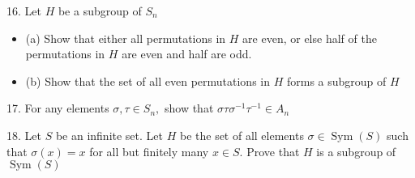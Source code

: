 \begin{mdframed}[style=darkAnswer,frametitle={Joe Starr}]
\end{mdframed}
\newpage
\begin{mdframed}[style=darkQuesion]
  16. Let $H$ be a subgroup of $S_{n}$
  \begin{itemize}
    \item []{(a) Show that either all permutations in $H$ are even, or else half of the permutations
    in $H$ are even and half are odd.}
    \item []{(b) Show that the set of all even permutations in $H$ forms a subgroup of $H$}
  \end{itemize}
\end{mdframed}
\begin{mdframed}[style=darkAnswer,frametitle={Joe Starr}]
\end{mdframed}
\newpage
\begin{mdframed}[style=darkQuesion]
  17. For any elements $\sigma, \tau \in S_{n},$ show that $\sigma \tau \sigma^{-1} \tau^{-1} \in A_{n}$
\end{mdframed}
\begin{mdframed}[style=darkAnswer,frametitle={Joe Starr}]
\end{mdframed}
\newpage
\begin{mdframed}[style=darkQuesion]
  18. Let $S$ be an infinite set. Let $H$ be the set of all elements $\sigma \in \operatorname{Sym}(S)$ such that $\sigma(x)=x$ for all but finitely many $x \in S .$ Prove that $H$ is a subgroup of $\operatorname{Sym}(S)$
\end{mdframed}
\begin{mdframed}[style=darkAnswer,frametitle={Joe Starr}]
\end{mdframed}
\newpage